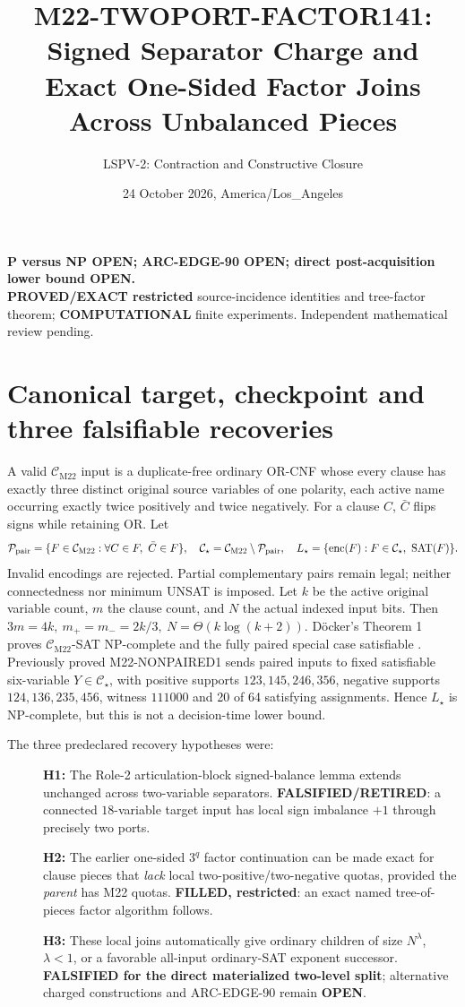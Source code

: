 \documentclass[11pt]{article}
\title{M22-TWOPORT-FACTOR141: Signed Separator Charge and Exact One-Sided Factor Joins Across Unbalanced Pieces}
\author{LSPV-2: Contraction and Constructive Closure}
\date{24 October 2026, America/Los\_Angeles}
\newcommand{\CM}{\mathcal C_{\mathrm{M22}}}
\newcommand{\CS}{\mathcal C_{\star}}
\newcommand{\SAT}{\operatorname{SAT}}
\begin{document}
\maketitle
\begin{center}
\textbf{P versus NP OPEN; ARC-EDGE-90 OPEN; direct post-acquisition lower bound OPEN.}\\
\textbf{PROVED/EXACT restricted} source-incidence identities and tree-factor theorem; \textbf{COMPUTATIONAL} finite experiments. Independent mathematical review pending.
\end{center}

\section{Canonical target, checkpoint and three falsifiable recoveries}
A valid \(\CM\) input is a duplicate-free ordinary OR-CNF whose every clause has exactly three distinct original source variables of one polarity, each active name occurring exactly twice positively and twice negatively. For a clause \(C\), \(\bar C\) flips signs while retaining OR. Let
\[
 \mathcal P_{\rm pair}=\{F\in\CM:\forall C\in F,\ \bar C\in F\},\quad
 \CS=\CM\setminus\mathcal P_{\rm pair},\quad
 L_\star=\{\operatorname{enc}(F):F\in\CS,\ \SAT(F)\}.
\]
Invalid encodings are rejected. Partial complementary pairs remain legal; neither connectedness nor minimum UNSAT is imposed. Let \(k\) be the active original variable count, \(m\) the clause count, and \(N\) the actual indexed input bits. Then \(3m=4k,\ m_+=m_-=2k/3,\ N=\Theta(k\log(k+2))\). D\"ocker's Theorem 1 proves \(\CM\)-SAT NP-complete and the fully paired special case satisfiable \cite{docker}. Previously proved M22-NONPAIRED1 sends paired inputs to fixed satisfiable six-variable \(Y\in\CS\), with positive supports \(123,145,246,356\), negative supports \(124,136,235,456\), witness \(111000\) and 20 of 64 satisfying assignments. Hence \(L_\star\) is NP-complete, but this is not a decision-time lower bound.

The three predeclared recovery hypotheses were:
\begin{description}
\item[] \textbf{H1:} The Role-2 articulation-block signed-balance lemma extends unchanged across two-variable separators. \textbf{FALSIFIED/RETIRED}: a connected \(18\)-variable target input has local sign imbalance \(+1\) through precisely two ports.
\item[] \textbf{H2:} The earlier one-sided \(3^q\) factor continuation can be made exact for clause pieces that \emph{lack} local two-positive/two-negative quotas, provided the \emph{parent} has M22 quotas. \textbf{FILLED, restricted}: an exact named tree-of-pieces factor algorithm follows.
\item[] \textbf{H3:} These local joins automatically give ordinary children of size \(N^\lambda\), \(\lambda<1\), or a favorable all-input ordinary-SAT exponent successor. \textbf{FALSIFIED for the direct materialized two-level split}; alternative charged constructions and ARC-EDGE-90 remain \textbf{OPEN}.
\end{description}
\end{document}
